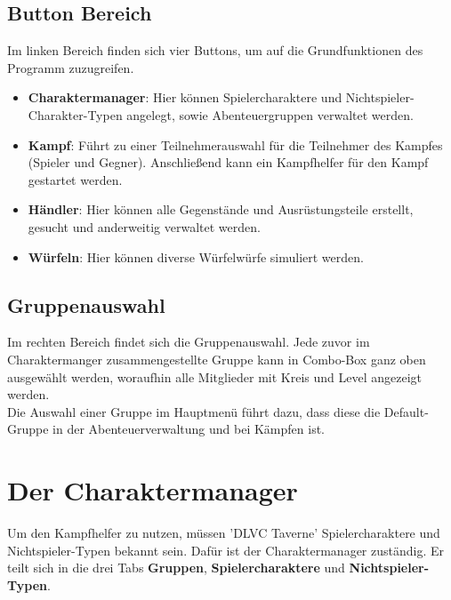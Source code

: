 \documentclass[11pt, a4paper, german]{article}
\begin{document}
\subsection{Button Bereich}
Im linken Bereich finden sich vier Buttons, um auf die Grundfunktionen des Programm zuzugreifen.
\begin{itemize}
	\item[] \textbf{Charaktermanager}: Hier können Spielercharaktere und Nichtspieler-Charakter-Typen angelegt, sowie Abenteuergruppen verwaltet werden.
	\item[] \textbf{Kampf}: Führt zu einer Teilnehmerauswahl für die Teilnehmer des Kampfes (Spieler und Gegner). Anschließend kann ein Kampfhelfer für den Kampf gestartet werden.
	\item[] \textbf{Händler}: Hier können alle Gegenstände und Ausrüstungsteile erstellt, gesucht und anderweitig verwaltet werden.
	\item[] \textbf{Würfeln}: Hier können diverse Würfelwürfe simuliert werden.
\end{itemize}

\subsection{Gruppenauswahl}\label{subsection:gruppenauswahl}
Im rechten Bereich findet sich die Gruppenauswahl. Jede zuvor im Charaktermanger zusammengestellte Gruppe kann in Combo-Box ganz oben ausgewählt werden, woraufhin alle Mitglieder mit Kreis und Level angezeigt werden.\\
Die Auswahl einer Gruppe im Hauptmenü führt dazu, dass diese die Default-Gruppe in der Abenteuerverwaltung und bei Kämpfen ist.

\newpage

\section{Der Charaktermanager}
Um den Kampfhelfer zu nutzen, müssen 'DLVC Taverne' Spielercharaktere und Nichtspieler-Typen bekannt sein. Dafür ist der Charaktermanager zuständig. Er teilt sich in die drei Tabs \textbf{Gruppen}, \textbf{Spielercharaktere} und \textbf{Nichtspieler-Typen}.
\end{document}
